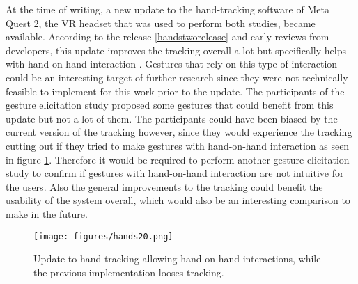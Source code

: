 At the time of writing, a new update to the hand-tracking software of Meta Quest 2, the VR headset that was used to perform both studies, became available. According to the release  \ref{handstworelease} and early reviews from developers, this update improves the tracking overall a lot but specifically helps with hand-on-hand interaction \cite{handstwoupdate}. Gestures that rely on this type of interaction could be an interesting target of further research since they were not technically feasible to implement for this work prior to the update. The participants of the gesture elicitation study proposed some gestures that could benefit from this update but not a lot of them. The participants could have been biased  by the current version of the tracking however, since they would experience the tracking cutting out if they tried to make gestures with hand-on-hand interaction as seen in figure \ref{fig:hands20}. Therefore it would be required to perform another gesture elicitation study to confirm if gestures with hand-on-hand interaction are not intuitive for the users. Also the general improvements to the tracking could benefit the usability of the system overall, which would also be an interesting comparison to make in the future. 

\begin{figure}[!ht]
    \centering
    \texttt{[image: figures/hands20.png]}
    \caption{Update to hand-tracking allowing hand-on-hand interactions, while the previous implementation looses tracking.}
    \label{fig:hands20}
\end{figure}
